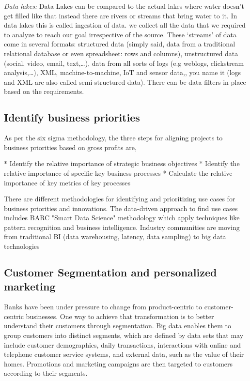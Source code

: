 \documentclass[sigconf]{acmart}
\begin{document}
\textit{Data lakes:} Data Lakes can be compared to the actual lakes where water doesn't get filled like that instead there are rivers or streams that bring water to it. In data lakes this is called ingestion of data. we collect all the data that we required to analyze to reach our goal irrespective of the source. These ‘streams’ of data come in several formats: structured data (simply said, data from a traditional relational database or even spreadsheet: rows and columns), unstructured data (social, video, email, text,…), data from all sorts of logs (e.g weblogs, clickstream analysis,…), XML, machine-to-machine, IoT and sensor data,, you name it (logs and XML are also called semi-structured data). There can be data filters in place based on the requirements.\cite{Data-lakes}



\subsection{Identify business priorities}
As per the six sigma methodology, the three steps for aligning projects to business priorities based on gross profits are, 

    * Identify the relative importance of strategic business objectives
    * Identify the relative importance of specific key business processes
    * Calculate the relative importance of key metrics of key processes
    
\cite{businesspriorities}There are different methodologies for identifying and prioritizing use cases for business priorities and innovations. The data-driven approach to find use cases includes BARC "Smart Data Science" methodology which apply techniques like pattern recognition and business intelligence. Industry communities are moving from traditional BI (data warehousing, latency, data sampling) to big data technologies

\subsection{Customer Segmentation and personalized marketing}

Banks have been under pressure to change from product-centric to customer-centric businesses. One way to achieve that transformation is  to better understand their customers through segmentation. Big data enables them to  group customers into distinct segments, which are defined by data sets that may include customer demographics, daily transactions, interactions with online and telephone customer service systems, and external data, such as the value of their homes. Promotions and marketing campaigns are then targeted to customers according to their  segments.\cite{5-big-data-use-cases-in-banking-and-financial-services}
\end{document}
